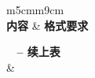 \begin{center}
  \begin{longtable}{m{5cm}m{9cm}}
     \label{tab:printrequirements} \\
  
    \hline\hline \textbf{内容} & \textbf{格式要求} \\ \hline\hline
    \endfirsthead
    
    {{\bfseries \tablename\ \thetable{} -- 续上表}} \\
    \hline\hline {} &  \\ \hline\hline
    \endhead
    
    \hline {} \\
    \endfoot
    
    \hline \hline
    \endlastfoot
    

\end{longtable}
\end{center}
